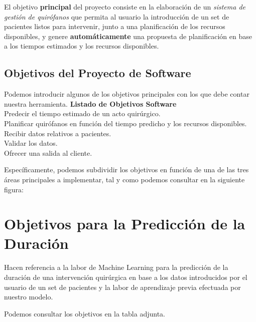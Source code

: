 
El objetivo \textbf{principal} del proyecto consiste en la elaboración de un \textit{sistema de gestión de quirófanos} que permita al usuario la introducción de un set de pacientes listos para intervenir, junto a una planificación de los recursos disponibles, y genere \textbf{automáticamente} una propuesta de planificación en base a los tiempos estimados y los recursos disponibles.

\subsection{Objetivos del Proyecto de Software}
Podemos introducir algunos de los objetivos principales con los que debe contar nuestra herramienta.
{\textbf{Listado de Objetivos Software}\\}{ 
 Predecir el tiempo estimado de un acto quirúrgico. \\ 
 Planificar quirófanos en función del tiempo predicho y los recursos disponibles. \\ 
 Recibir datos relativos a pacientes. \\
 Validar los datos.\\
 Ofrecer una salida al cliente. \\ 
 } 

Específicamente, podemos subdividir los objetivos en función de una de las tres áreas principales a implementar, tal y como podemos consultar en la siguiente figura:


\newpage

\section{Objetivos para la Predicción de la Duración}

Hacen referencia a la labor de Machine Learning para la predicción de la duración de una intervención quirúrgica en base a los datos introducidos por el usuario de un set de pacientes y la labor de aprendizaje previa efectuada por nuestro modelo.

Podemos consultar los objetivos en la tabla adjunta.

